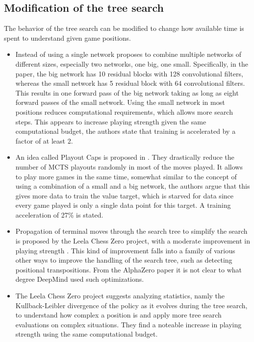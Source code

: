 \documentclass[12pt,onecolumn,oneside,titlepage]{article}
\begin{document}
\subsection{Modification of the tree search}

The behavior of the tree search can be modified to change how available time is spent to understand given game positions.

\begin{itemize}
 \item Instead of using a single network \cite{lan2019multiple} proposes to combine multiple networks of different sizes, especially two networks, one big, one small. Specifically, in the paper, the 
 big network has 10 residual blocks with 128 convolutional filters, whereas the small network has 5 residual block with 64 convolutional filters. This results in one forward pass of the big network taking as long as eight forward passes of the small network.
 Using the small network in most positions reduces computational requirements, 
 which allows more search steps. This appears to increase playing strength given the same computational budget, the authors state that training is accelerated by a factor of at least 2.
 \item An idea called Playout Caps is proposed in \cite{wu2019accelerating}. They drastically reduce the number of MCTS playouts randomly in most of the moves played. It allows to play more games in the same time, somewhat similar to 
 the concept of using a combination of a small and a big network, the authors argue that this gives more data to train the value target, which is starved for data since every game played is only a single data point for this target. A training acceleration of 27\% is stated.
 \item Propagation of terminal moves through the search tree to simplify the search is proposed by the Leela Chess Zero project, with a moderate improvement in playing strength \cite{leela0propagation}. This kind of improvement falls
 into a family of various other ways to improve the handling of the search tree, such as detecting positional transpositions. From the AlphaZero paper it is not clear to what degree DeepMind used such optimizations.
 \item The Leela Chess Zero project suggests analyzing statistics, namly the Kullback-Leibler divergence of the policy as it evolves during the tree search, to understand how complex a position is and apply more tree search evaluations on complex situations. They find a noteable increase
   in playing strength \cite{leela0kldgain} using the same computational budget.
\end{itemize}
\end{document}
